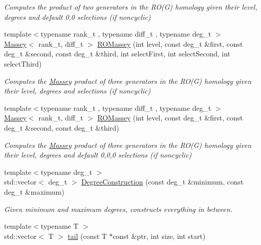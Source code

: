 \begin{DoxyCompactItemize}
\begin{DoxyCompactList}\small\item\em Computes the product of two generators in the R\+O(\+G) homology given their level, degrees and default 0,0 selections (if noncyclic) \end{DoxyCompactList}\item 
{\footnotesize template$<$typename rank\+\_\+t , typename diff\+\_\+t , typename deg\+\_\+t $>$ }\\\hyperlink{classMackey_1_1Massey}{Massey}$<$ rank\+\_\+t, diff\+\_\+t $>$ \hyperlink{namespaceMackey_aa98cd58919c2f716d8df7d61ef1f5c07}{R\+O\+Massey} (int level, const deg\+\_\+t \&first, const deg\+\_\+t \&second, const deg\+\_\+t \&third, int select\+First, int select\+Second, int select\+Third)
\begin{DoxyCompactList}\small\item\em Computes the \hyperlink{classMackey_1_1Massey}{Massey} product of three generators in the R\+O(\+G) homology given their level, degrees and selections (if noncyclic) \end{DoxyCompactList}\item 
{\footnotesize template$<$typename rank\+\_\+t , typename diff\+\_\+t , typename deg\+\_\+t $>$ }\\\hyperlink{classMackey_1_1Massey}{Massey}$<$ rank\+\_\+t, diff\+\_\+t $>$ \hyperlink{namespaceMackey_a7301f53f372c1dc670b4c10f878137a2}{R\+O\+Massey} (int level, const deg\+\_\+t \&first, const deg\+\_\+t \&second, const deg\+\_\+t \&third)
\begin{DoxyCompactList}\small\item\em Computes the \hyperlink{classMackey_1_1Massey}{Massey} product of three generators in the R\+O(\+G) homology given their level, degrees and default 0,0,0 selections (if noncyclic) \end{DoxyCompactList}\item 
{\footnotesize template$<$typename deg\+\_\+t $>$ }\\std\+::vector$<$ deg\+\_\+t $>$ \hyperlink{namespaceMackey_a49fef6f64b67ff118d35ac45b9c92972}{Degree\+Construction} (const deg\+\_\+t \&minimum, const deg\+\_\+t \&maximum)
\begin{DoxyCompactList}\small\item\em Given minimum and maximum degrees, constructs everything in between. \end{DoxyCompactList}\item 
{\footnotesize template$<$typename T $>$ }\\std\+::vector$<$ T $>$ \hyperlink{namespaceMackey_a1e4b11e9d2a5b70f8380af87cae31ef3}{tail} (const T $\ast$const \&ptr, int size, int start)

\end{DoxyCompactItemize}
